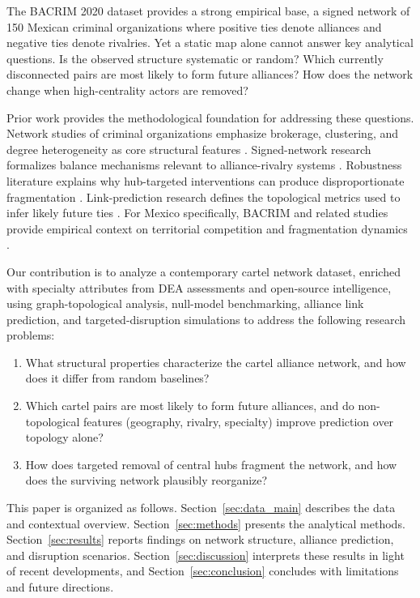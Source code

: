 \documentclass[11pt, a4paper]{article}
\begin{document}
The BACRIM 2020 dataset \citep{prietocuriel2023bacrim} provides a strong empirical base, a signed network of 150 Mexican criminal organizations where positive ties denote alliances and negative ties denote rivalries. Yet a static map alone cannot answer key analytical questions. Is the observed structure systematic or random? Which currently disconnected pairs are most likely to form future alliances? How does the network change when high-centrality actors are removed?

Prior work provides the methodological foundation for addressing these questions. Network studies of criminal organizations emphasize brokerage, clustering, and degree heterogeneity as core structural features \citep{morselli2009inside, sparrow1991application}. Signed-network research formalizes balance mechanisms relevant to alliance-rivalry systems \citep{heider1946attitudes, cartwright1956structural, leskovec2010predicting}. Robustness literature explains why hub-targeted interventions can produce disproportionate fragmentation \citep{albert2000error, duijn2014relative}. Link-prediction research defines the topological metrics used to infer likely future ties \citep{libennowell2007link, berlusconi2016link}. For Mexico specifically, BACRIM and related studies provide empirical context on territorial competition and fragmentation dynamics \citep{prietocuriel2023bacrim, coscia2012knowing, calderon2015beheading}.

Our contribution is to analyze a contemporary cartel network dataset, enriched with specialty attributes from DEA assessments and open-source intelligence, using graph-topological analysis, null-model benchmarking, alliance link prediction, and targeted-disruption simulations to address the following research problems:

\begin{enumerate}[label=\textbf{RP\arabic*:}, leftmargin=2.5em]
    \item What structural properties characterize the cartel alliance network, and how does it differ from random baselines?
    \item Which cartel pairs are most likely to form future alliances, and do non-topological features (geography, rivalry, specialty) improve prediction over topology alone?
    \item How does targeted removal of central hubs fragment the network, and how does the surviving network plausibly reorganize?
\end{enumerate}

This paper is organized as follows. Section~\ref{sec:data_main} describes the data and contextual overview. Section~\ref{sec:methods} presents the analytical methods. Section~\ref{sec:results} reports findings on network structure, alliance prediction, and disruption scenarios. Section~\ref{sec:discussion} interprets these results in light of recent developments, and Section~\ref{sec:conclusion} concludes with limitations and future directions.
\end{document}
